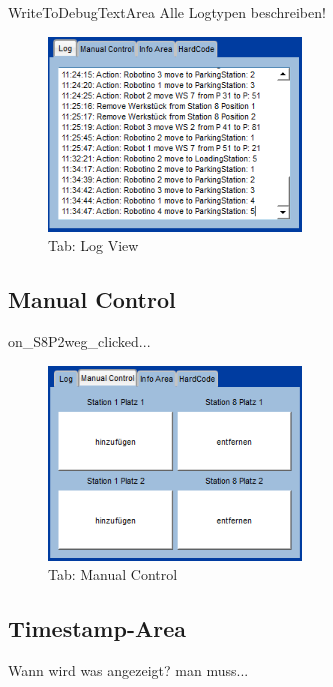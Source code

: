 WriteToDebugTextArea
Alle Logtypen beschreiben!

\begin{figure}[htb]
    \centering
    \includegraphics[width=0.6\textwidth]{Abbildungen/Log.png}
    \caption{Tab: Log View}		
    \label{fig:Log}
\end{figure}

\subsection{Manual Control}

on_S8P2weg_clicked...

\begin{figure}[htb]
    \centering
    \includegraphics[width=0.6\textwidth]{Abbildungen/ManualControl.png}
    \caption{Tab: Manual Control}		
    \label{fig:ManualControl}
\end{figure}

\subsection{Timestamp-Area}

Wann wird was angezeigt? man muss...

